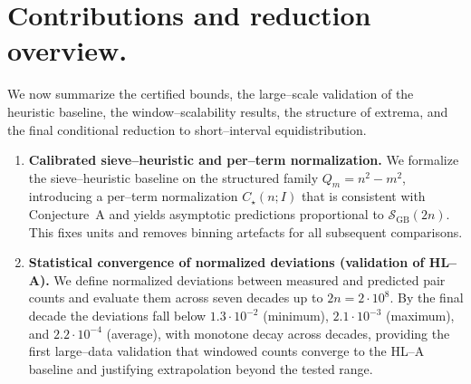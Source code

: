 \documentclass[11pt]{article}
\theoremstyle{inline}
\theoremstyle{break}
\theoremstyle{break}
\theoremstyle{break}
\theoremstyle{break}
\theoremstyle{break}
\theoremstyle{break}
\theoremstyle{break}
\theoremstyle{inline}
\newcommand{\xLambdaMinLimit}{1.3\cdot 10^{-2}} %
\newcommand{\xLambdaMaxLimit}{2.1\cdot 10^{-3}} %
\newcommand{\xLambdaAvgLimit}{2.2\cdot 10^{-4}} %
\newcommand{\SGB}{\mathcal{S}_{\scriptscriptstyle\mathrm{GB}}}
\begin{document}

\section{Contributions and reduction overview.}
We now summarize the certified bounds, the large–scale validation of the heuristic baseline, the window–scalability results, the structure of extrema, and the final conditional reduction to short–interval equidistribution.

\begin{enumerate}
  \item \textbf{Calibrated sieve–heuristic and per–term normalization.}
  We formalize the sieve–heuristic baseline on the structured family \(Q_m=n^2-m^2\), introducing a per–term normalization \( C_\star(n;I) \) that is consistent with Conjecture~A and yields asymptotic predictions proportional to \( \SGB(2n) \). This fixes units and removes binning artefacts for all subsequent comparisons.

  \item \textbf{Statistical convergence of normalized deviations (validation of HL–A).}
  We define normalized deviations between measured and predicted pair counts and evaluate them across seven decades up to \(2n=2\cdot 10^8\). By the final decade the deviations fall below
  \( \xLambdaMinLimit \) (minimum), \( \xLambdaMaxLimit \) (maximum), and \( \xLambdaAvgLimit \) (average), with monotone decay across decades, providing the first large–data validation that windowed counts converge to the HL–A baseline and justifying extrapolation beyond the tested range.


\end{enumerate}
\end{document}
